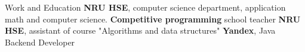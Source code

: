 \begin{rubric}{Work and Education}
\entry*[\textbf{2019 -- 2023}]
	\textbf{NRU HSE}, computer science department, application math and computer science.
\entry*[\textbf{2019 -- 2020}]
	\textbf{Competitive programming} school teacher
\entry*[\textbf{2020 -- 2021}]
    \textbf{NRU HSE}, assistant of course "Algorithms and data structures"
	\textbf{Yandex}, Java Backend Developer
\end{rubric}
